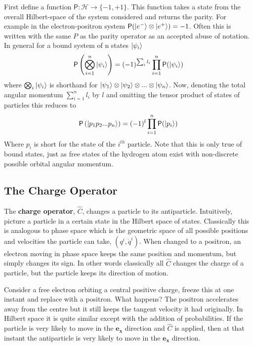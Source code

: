 First define a function $\mathsf{P}:\mathcal{H}\rightarrow \{-1,+1\}$. This function takes a state from the overall Hilbert-space of the system considered and returns the parity. For example in the electron-positron system $\mathsf{P}(\ket{e^-}\otimes\ket{e^+})=-1$. Often this is written with the same $P$ as the parity operator as an accepted abuse of notation. In general for a bound system of n states $\ket{\psi_i}$
\begin{align*}
\mathsf{P}\left(\bigotimes_{i=1}^n\ket{\psi_i}\right)=(-1)^{\sum_i l_i} \prod_{i=1}^n\mathsf{P}(\ket{\psi_i})
\end{align*}
where $\bigotimes_i\ket{\psi_i}$ is shorthand for $\ket{\psi_1}\otimes\ket{\psi_2}\otimes...\otimes\ket{\psi_n}$. Now, denoting the total angular momentum $\sum_{i=1}^n l_i$ by $l$ and omitting the tensor product of states of particles this reduces to
\begin{align*}
\mathsf{P}\left(\ket{p_1p_2...p_n}\right)=(-1)^{l} \prod_{i=1}^n\mathsf{P}(\ket{p_i})
\end{align*}
Where $p_i$ is short for the state of the $i^{th}$ particle. Note that this is only true of bound states, just as free states of the hydrogen atom exist with non-discrete possible orbital angular momentum.

\subsection{The Charge Operator}
The \textbf{charge operator}, $\hat{C}$, changes a particle to its antiparticle. Intuitively, picture a particle in a certain state in the Hilbert space of states. Classically this is analogous to phase space which is the geometric space of all possible positions and velocities the particle can take, $(q^i,\dot{q}^i)$. When changed to a positron, an electron moving in phase space keeps the same position and momentum, but simply changes its sign. In other words classically all $\hat{C}$ changes the charge of a particle, but the particle keeps its direction of motion.

Consider a free electron orbiting a central positive charge, freeze this at one instant and replace with a positron. What happens? The positron accelerates away from the centre but it still keeps the tangent velocity it had originally. In Hilbert space it is quite similar except with the addition of probabilities. If the particle is very likely to move in the $\mathbf{e_x}$ direction and $\hat{C}$ is applied, then at that instant the antiparticle is very likely to move in the $\mathbf{e_x}$ direction.

